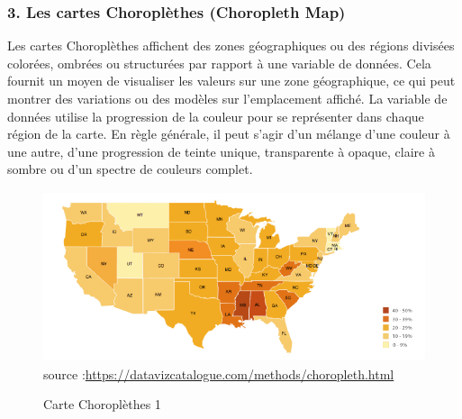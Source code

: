 \documentclass[french, a4paper, 12pt]{report}
\begin{document}
\subsubsection{3. Les cartes Choroplèthes (Choropleth Map)}
Les cartes Choroplèthes affichent des zones géographiques ou des régions divisées colorées, ombrées ou structurées par rapport à une variable de données. Cela fournit un moyen de visualiser les valeurs sur une zone géographique, ce qui peut montrer des variations ou des modèles sur l'emplacement affiché.
La variable de données utilise la progression de la couleur pour se représenter dans chaque région de la carte. En règle générale, il peut s'agir d'un mélange d'une couleur à une autre, d'une progression de teinte unique, transparente à opaque, claire à sombre ou d'un spectre de couleurs complet.
\begin{figure}[!ht]
    \centering
    \includegraphics[height=5cm]{images/choropleth.png}
    \scriptsize{source :\url{https://datavizcatalogue.com/methods/choropleth.html}}
    \caption{Carte Choroplèthes 1}
    \label{fig:1.9}
\end{figure}
\end{document}
